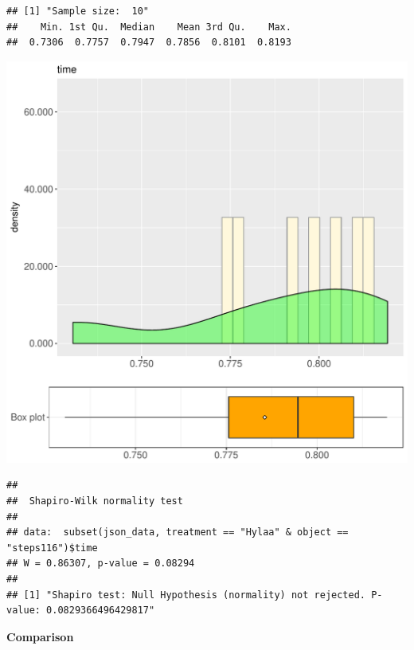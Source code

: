 \documentclass{article}\usepackage[]{graphicx}\usepackage[]{color}
\makeatletter
\def\maxwidth{ %
  \ifdim\Gin@nat@width>\linewidth
    \linewidth
  \else
    \Gin@nat@width
  \fi
}
\newenvironment{kframe}{%
 \def\at@end@of@kframe{}%
 \ifinner\ifhmode%
  \def\at@end@of@kframe{\end{minipage}}%
  \begin{minipage}{\columnwidth}%
 \fi\fi%
 \def\FrameCommand##1{\hskip\@totalleftmargin \hskip-\fboxsep
 \colorbox{shadecolor}{##1}\hskip-\fboxsep
     \hskip-\linewidth \hskip-\@totalleftmargin \hskip\columnwidth}%
 \MakeFramed {\advance\hsize-\width
   \@totalleftmargin\z@ \linewidth\hsize
   \@setminipage}}%
 {\par\unskip\endMakeFramed%
 \at@end@of@kframe}
\newenvironment{knitrout}{}{} %
\makeatother
\begin{document}
\begin{knitrout}
\color{fgcolor}\begin{kframe}
\begin{verbatim}
## [1] "Sample size:  10"
##    Min. 1st Qu.  Median    Mean 3rd Qu.    Max. 
##  0.7306  0.7757  0.7947  0.7856  0.8101  0.8193
\end{verbatim}
\end{kframe}
\includegraphics[width=\maxwidth]{figure/RH3_Hylaa_steps116-1} 
\begin{kframe}\begin{verbatim}
## 
## 	Shapiro-Wilk normality test
## 
## data:  subset(json_data, treatment == "Hylaa" & object == "steps116")$time
## W = 0.86307, p-value = 0.08294
## 
## [1] "Shapiro test: Null Hypothesis (normality) not rejected. P-value: 0.0829366496429817"
\end{verbatim}
\end{kframe}
\end{knitrout}
  
 \textbf{Comparison}
  
\end{document}
